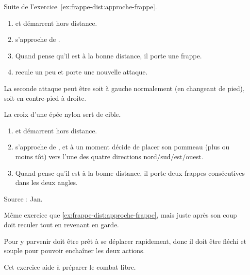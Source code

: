 \begin{exercice}
\label{ex:frappe-dist:approche-double-frappe}

Suite de l'exercice~\ref{ex:frappe-dist:approche-frappe}.

\begin{enumerate}
	\item \A et \D démarrent hors distance.
	\item \D s'approche de \A.
	\item Quand \A pense qu'il est à la bonne distance, il porte une frappe.
	\item \D recule un peu et \A porte une nouvelle attaque.
\end{enumerate}

La seconde attaque peut être soit à gauche normalement (en changeant de pied), soit en contre-pied à droite.
\end{exercice}


\begin{exercice}
\label{ex:frappe-dist:approche-croix-aleat}

La croix d'une épée nylon sert de cible.

\begin{enumerate}
	\item \A et \D démarrent hors distance.
	\item \D s'approche de \A, et à un moment décide de placer son pommeau (plus ou moins tôt) vers l'une des quatre directions nord/sud/est/ouest.
	\item Quand \A pense qu'il est à la bonne distance, il porte deux frappes consécutives dans les deux angles.
\end{enumerate}

Source : Jan.

\end{exercice}


\begin{exercice}
\label{ex:frappe-dist:approche-croix-aleat-garde}

Même exercice que \ref{ex:frappe-dist:approche-frappe}, mais juste après son coup \A doit reculer tout en revenant en garde.

Pour y parvenir \A doit être prêt à se déplacer rapidement, donc il doit être fléchi et souple pour pouvoir enchaîner les deux actions.

Cet exercice aide à préparer le combat libre.

\end{exercice}


